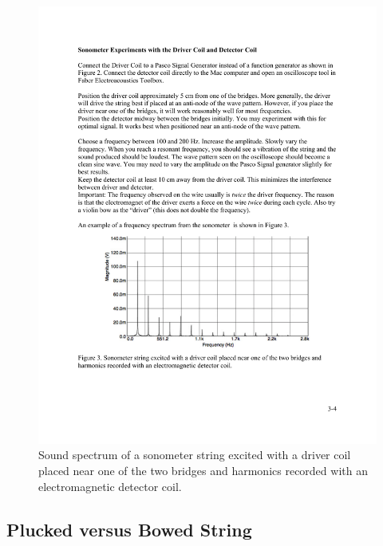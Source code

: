 \documentclass[11pt]{NSF}
\begin{document}
\begin{figure}[hbtp] 
\begin{center} 
\includegraphics[width=.7\textwidth]{fig3_3}
\caption{Sound spectrum of a 
sonometer string excited with a driver coil placed near one of the 
two bridges and harmonics recorded with an electromagnetic detector coil.}
\label{f:3} 
\end{center} 
\end{figure}
%
\pagebreak


\subsection{Plucked versus Bowed String}
\end{document}
